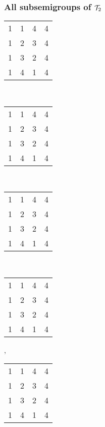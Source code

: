 \documentclass{beamer}
\newcommand{\cT}{{\cal T}}
\newcommand{\jmp}{\vskip3pt}
\begin{document}
\begin{frame}\frametitle{All subsemigroups of $\cT_2$}

\renewcommand{\arraystretch}{0.3}
\begin{center}
\begin{tabular}{@{}c@{}c@{}c@{}c@{}}
1&1&4&4\\
1&2&3&4\\
1&3&2&4\\
1&4&1&4\\
\end{tabular}\\\jmp 
\begin{tabular}{@{}c@{}c@{}c@{}c@{}}
1&1&\color{lgr}4&4\\
1&2&\color{lgr}3&4\\
\color{lgr}1&\color{lgr}3&\color{lgr}2&\color{lgr}4\\
1&4&\color{lgr}1&4\\
\end{tabular}\\\jmp 
\begin{tabular}{@{}c@{}c@{}c@{}c@{}}
\color{lgr}1&\color{lgr}1&\color{lgr}4&\color{lgr}4\\
\color{lgr}1&2&3&\color{lgr}4\\
\color{lgr}1&3&2&\color{lgr}4\\
\color{lgr}1&\color{lgr}4&\color{lgr}1&\color{lgr}4\\
\end{tabular}\\\jmp

\begin{tabular}{@{}c@{}c@{}c@{}c@{}}
\color{lgr}1&\color{lgr}1&\color{lgr}4&\color{lgr}4\\
\color{lgr}1&2&\color{lgr}3&4\\
\color{lgr}1&\color{lgr}3&\color{lgr}2&\color{lgr}4\\
\color{lgr}1&4&\color{lgr}1&4\\
\end{tabular},\ \ \ 
\begin{tabular}{@{}c@{}c@{}c@{}c@{}}
1&1&\color{lgr}4&\color{lgr}4\\
1&2&\color{lgr}3&\color{lgr}4\\
\color{lgr}1&\color{lgr}3&\color{lgr}2&\color{lgr}4\\
\color{lgr}1&\color{lgr}4&\color{lgr}1&\color{lgr}4\\
\end{tabular}\\\jmp


\end{center}
\end{frame}
\end{document}
